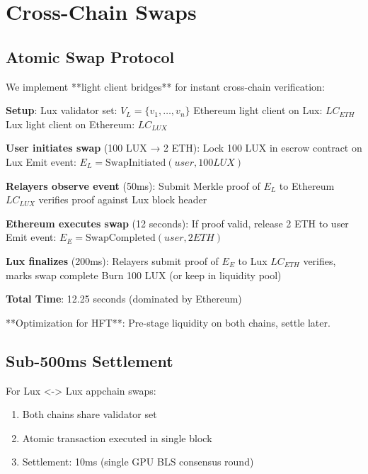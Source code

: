 \documentclass[11pt,letterpaper]{article}
\begin{document}
\section{Cross-Chain Swaps}

\subsection{Atomic Swap Protocol}

We implement **light client bridges** for instant cross-chain verification:

\begin{algorithm}
\caption{Lux <-> Ethereum Atomic Swap}
\begin{algorithmic}
\STATE \textbf{Setup}:
\STATE Lux validator set: $V_L = \{v_1, \ldots, v_n\}$
\STATE Ethereum light client on Lux: $LC_{ETH}$
\STATE Lux light client on Ethereum: $LC_{LUX}$

\STATE \textbf{User initiates swap} (100 LUX → 2 ETH):
\STATE Lock 100 LUX in escrow contract on Lux
\STATE Emit event: $E_L = \text{SwapInitiated}(user, 100 LUX)$

\STATE \textbf{Relayers observe event} (50ms):
\STATE Submit Merkle proof of $E_L$ to Ethereum
\STATE $LC_{LUX}$ verifies proof against Lux block header

\STATE \textbf{Ethereum executes swap} (12 seconds):
\STATE If proof valid, release 2 ETH to user
\STATE Emit event: $E_E = \text{SwapCompleted}(user, 2 ETH)$

\STATE \textbf{Lux finalizes} (200ms):
\STATE Relayers submit proof of $E_E$ to Lux
\STATE $LC_{ETH}$ verifies, marks swap complete
\STATE Burn 100 LUX (or keep in liquidity pool)

\STATE \textbf{Total Time}: 12.25 seconds (dominated by Ethereum)
\end{algorithmic}
\end{algorithm}

**Optimization for HFT**: Pre-stage liquidity on both chains, settle later.

\subsection{Sub-500ms Settlement}

For Lux <-> Lux appchain swaps:

\begin{enumerate}
    \item Both chains share validator set
    \item Atomic transaction executed in single block
    \item Settlement: 10ms (single GPU BLS consensus round)
\end{enumerate}
\end{document}
